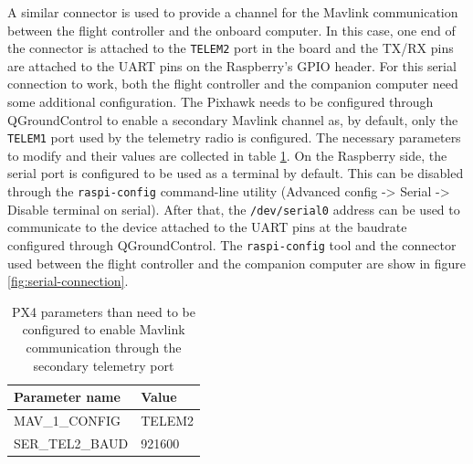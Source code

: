 A similar connector is used to provide a channel for the Mavlink communication between the flight controller and the onboard computer.
In this case, one end of the connector is attached to the \texttt{TELEM2} port in the board and the TX/RX pins are attached to the UART pins on the Raspberry's GPIO header.
For this serial connection to work, both the flight controller and the companion computer need some additional configuration.
The Pixhawk needs to be configured through QGroundControl to enable a secondary Mavlink channel as, by default, only the \texttt{TELEM1} port used by the telemetry radio is configured.
The necessary parameters to modify and their values are collected in table \ref{tab:telem2-params}.
On the Raspberry side, the serial port is configured to be used as a terminal by default.
This can be disabled through the \texttt{raspi-config} command-line utility (Advanced config -> Serial -> Disable terminal on serial).
After that, the \texttt{/dev/serial0} address can be used to communicate to the device attached to the UART pins at the baudrate configured through QGroundControl.
The \texttt{raspi-config} tool and the connector used between the flight controller and the companion computer are show in figure \ref{fig:serial-connection}.

\begin{table}[h!]
 \begin{center}
  \begin{tabular}{l|l}
    Parameter name & Value \\ \hline
    MAV\_1\_CONFIG & TELEM2 \\
    SER\_TEL2\_BAUD & 921600 \\
  \end{tabular}
  \caption{PX4 parameters than need to be configured to enable Mavlink communication through the secondary telemetry port}
  \label{tab:telem2-params}
 \end{center}
\end{table}


